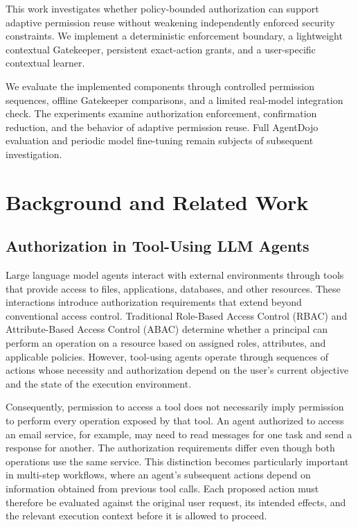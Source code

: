 \documentclass[10pt,conference]{IEEEtran}
\begin{document}
This work investigates whether policy-bounded
authorization can support adaptive permission
reuse without weakening independently enforced
security constraints. We implement a deterministic
enforcement boundary, a lightweight contextual
Gatekeeper, persistent exact-action grants, and
a user-specific contextual learner.

We evaluate the implemented components through
controlled permission sequences, offline
Gatekeeper comparisons, and a limited real-model
integration check. The experiments examine
authorization enforcement, confirmation
reduction, and the behavior of adaptive
permission reuse. Full AgentDojo evaluation
and periodic model fine-tuning remain subjects
of subsequent investigation.



\section{Background and Related Work}

\subsection{Authorization in Tool-Using LLM Agents}

Large language model agents interact with external environments through tools that provide access to files, applications, databases, and other resources. These interactions introduce authorization requirements that extend beyond conventional access control. Traditional Role-Based Access Control (RBAC) and Attribute-Based Access Control (ABAC) determine whether a principal can perform an operation on a resource based on assigned roles, attributes, and applicable policies. However, tool-using agents operate through sequences of actions whose necessity and authorization depend on the user's current objective and the state of the execution environment.

Consequently, permission to access a tool does not necessarily imply permission to perform every operation exposed by that tool. An agent authorized to access an email service, for example, may need to read messages for one task and send a response for another. The authorization requirements differ even though both operations use the same service. This distinction becomes particularly important in multi-step workflows, where an agent's subsequent actions depend on information obtained from previous tool calls. Each proposed action must therefore be evaluated against the original user request, its intended effects, and the relevant execution context before it is allowed to proceed.
\end{document}
